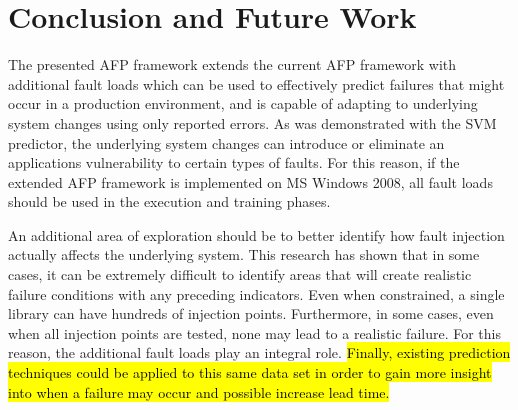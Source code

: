 \section{Conclusion and Future Work} \label{chapter5}
The presented \ac{AFP} framework extends the current \ac{AFP} framework with
additional fault loads which can be used to effectively predict failures that
might occur in a production environment, and is capable of adapting to
underlying system changes using only reported errors.  As was demonstrated with
the \ac{SVM} predictor, the underlying system changes can introduce or
eliminate an applications vulnerability to certain types of faults.  For this
reason, if the extended \ac{AFP} framework is implemented on \ac{MS} Windows
2008, all fault loads should be used in the execution and training phases.

An additional area of exploration should be to better identify how fault
injection actually affects the underlying system.  This research has shown that
in some cases, it can be extremely difficult to identify areas that will create
realistic failure conditions with any preceding indicators.  Even when
constrained, a single library can have hundreds of injection points.
Furthermore, in some cases, even when all injection points are tested, none may
lead to a realistic failure.  For this reason, the additional fault loads play
an integral role.  \hl{Finally, existing prediction techniques could be applied
to this same data set in order to gain more insight into when a failure may
occur and possible increase lead time.}
